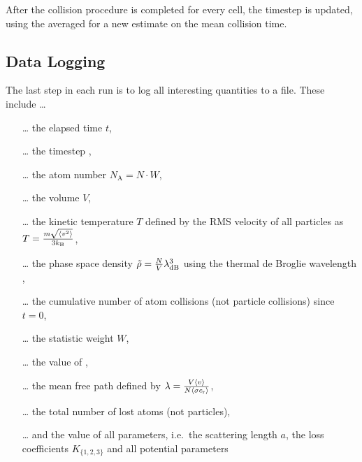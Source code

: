 After the collision procedure is completed for every cell, the timestep \Dt is updated, using the averaged \meanProb for a new estimate on the mean collision time.

\subsection{Data Logging}
The last step in each run is to log all interesting quantities to a file. These include \ldots 
\begin{itemize}
    \item[\ldots] the elapsed time $t$,
    \item[\ldots] the timestep \Dt,
    \item[\ldots] the atom number $N_\text{A} = N\cdot W$,
    \item[\ldots] the volume $V$,
    \item[\ldots] the kinetic temperature $T$ defined by the RMS velocity of all particles as $T = \frac{m\sqrt{\langle v^2\rangle}}{3k_\text{B}}$,
    \item[\ldots] the phase space density $\tilde{\rho} = \frac{N}{V}\lambda_\text{dB}^3$ using the thermal de Broglie wavelength \lambdadB{},
    \item[\ldots] the cumulative number of atom collisions (not particle collisions) since $t=0$,
    \item[\ldots] the statistic weight $W$,
    \item[\ldots] the value of \maxProb{},
    \item[\ldots] the mean free path defined by $\lambda = \frac{V\langle v\rangle}{N\langle\sigma c_\text{r}\rangle}$,
    \item[\ldots] the total number of lost atoms (not particles),
    \item[\ldots] and the value of all parameters, i.e.\ the scattering length $a$, the loss coefficients $K_{\{1,2,3\}}$ and all potential parameters     
\end{itemize}
